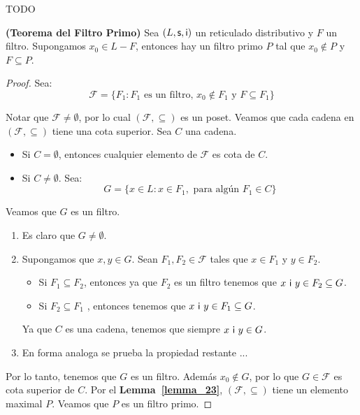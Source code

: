  TODO
  \begin{theorem} \label{theorem_24}
    \PN \textbf{(Teorema del Filtro Primo)} Sea $(L, \mathsf{s}, \mathsf{i})$ un reticulado distributivo y $F$ un filtro. Supongamos $x_{0} \in
    L-F$, entonces hay un filtro primo $P$ tal que $x_{0} \notin P$ y $F \subseteq P$.
  \end{theorem}
  \begin{proof}
    \PN Sea:
    \[
      \mathcal{F} = \{F_{1}: F_{1} \text{ es un filtro, } x_{0} \notin F_{1} \text{ y } F \subseteq F_{1}\}
    \]

    \PN Notar que $\mathcal{F} \neq \emptyset$, por lo cual $(\mathcal{F}, \subseteq)$ es un poset.
    \PN Veamos que cada cadena en $(\mathcal{F}, \subseteq)$ tiene una cota superior. Sea $C$ una cadena.
    \begin{itemize}
      \item Si $C = \emptyset$, entonces cualquier elemento de $\mathcal{F}$ es cota de $C$.
      \item Si $C \neq \emptyset$. Sea:
        \[
          G = \{x \in L: x \in F_{1}, \text{ para algún } F_{1} \in C\}
        \]
    \end{itemize}

    \PN Veamos que $G$ es un filtro.
    \begin{enumerate}
      \item Es claro que $G \neq \emptyset$.
      \item Supongamos que $ x,y\in G$. Sean $F_{1},F_{2}\in \mathcal{F}$ tales que $x\in F_{1}$ y $y\in F_{2}$.
      \begin{itemize}
        \item Si $F_{1}\subseteq F_{2}$, entonces ya que $F_{2}$ es un filtro tenemos que $x \ \mathsf{i} \ y\in F_{2}\subseteq G$.
        \item Si $F_{2}\subseteq F_{1}$ , entonces tenemos que $x \ \mathsf{i} \ y \in F_{1} \subseteq G$.
      \end{itemize}
      \PN Ya que $C$ es una cadena, tenemos que siempre $x \ \IN \ y \in G$.

      \item En forma analoga se prueba la propiedad restante ... %
    \end{enumerate}

    \PN Por lo tanto, tenemos que $G$ es un filtro. Además $x_{0} \notin G$, por lo que $G \in \mathcal{F}$ es cota
    superior de $C$. Por el \textbf{Lemma~\ref{lemma_23}}, $(\mathcal{F}, \subseteq)$ tiene un elemento maximal $P$.
    Veamos que $P$ es un filtro primo.


\end{proof}
